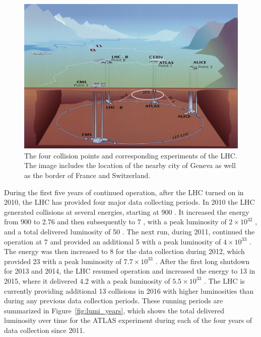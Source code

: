 \begin{figure}
\centering
\includegraphics[width=\fullfig]{figures/cern_locations.jpg}
\caption{The four collision points and corresponding experiments of the \ac{LHC}. The image includes the location of the nearby city of Geneva as well as the border of France and Switzerland.}
\label{fig:cern_locations}
\end{figure}

During the first five years of continued operation, after the \ac{LHC} turned on in 2010, the \ac{LHC} has provided four major data collecting periods.
In 2010 the \ac{LHC} generated collisions at several energies, starting at 900 \GeV. 
It increased the energy from 900 \GeV to 2.76 \TeV and then subsequently to 7 \TeV, with a peak luminosity of $2 \times 10^{32}$ \lcms, and a total delivered luminosity of 50 \ipb.
The next run, during 2011, continued the operation at 7 \TeV and provided an additional 5 \ifb with a peak luminosity of $4 \times 10^{33}$ \lcms. 
The energy was then increased to 8 \TeV for the data collection during 2012, which provided 23 \ifb with a peak luminosity of $7.7 \times 10^{33}$ \lcms.
After the first long shutdown for 2013 and 2014, the \ac{LHC} resumed operation and increased the energy to 13 \TeV in 2015, where it delivered 4.2 \ifb with a peak luminosity of $5.5 \times 10^{33}$ \lcms. 
The \ac{LHC} is currently providing additional 13 \TeV collisions in 2016 with higher luminosities than during any previous data collection periods.
These running periods are summarized in Figure~\ref{fig:lumi_years}, which shows the total delivered luminosity over time for the \ac{ATLAS} experiment during each of the four years of data collection since 2011.

